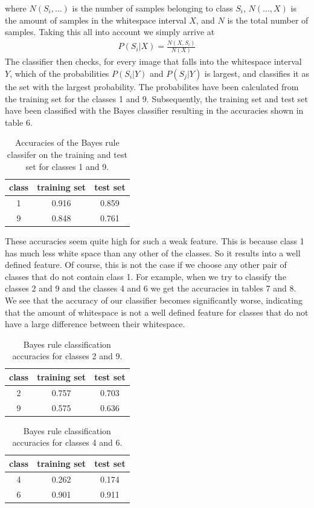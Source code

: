 \documentclass[11pt]{article}
\begin{document}
where $N(S_i, ...)$ is the number of samples belonging to class $S_i$, $N(..., X)$ is the amount of samples in the whitespace interval $X$, and $N$ is the total number of samples. Taking this all into account we simply arrive at
\begin{align}
P(S_i|X)=\frac{N(X, S_i)}{N(X)}
\end{align}
The classifier then checks, for every image that falls into the whitespace interval $Y$, which of the probabilities $P(S_i|Y)$ and $P(S_j|Y)$ is largest, and classifies it as the set with the largest probability. The probabilites have been calculated from the training set for the classes 1 and 9. Subsequently, the training set and test set have been classified with the Bayes classifier resulting in the accuracies shown in table 6.\par
\begin{table}[t]
\centering
\small
\begin{tabular}{c|cc}
class&training set&test set\\\hline
1&0.916&0.859\\
9&0.848&0.761\\
\end{tabular}
\caption{Accuracies of the Bayes rule classifer on the training and test set for classes 1 and 9.}
\normalsize
\end{table}
These accuracies seem quite high for such a weak feature. This is because class 1 has much less white space than any other of the classes. So it results into a well defined feature. Of course, this is not the case if we choose any other pair of classes that do not contain class 1. For example, when we try to classify the classes 2 and 9 and the classes 4 and 6 we get the accuracies in tables 7 and 8.
We see that the accuracy of our classifier becomes significantly worse, indicating that the amount of whitespace is not a well defined feature for classes that do not have a large difference between their whitespace.
\begin{table}[!h]
\centering
\small
\begin{tabular}{c|cc}
class&training set&test set\\\hline
2&0.757&0.703\\
9&0.575&0.636
\end{tabular}
\caption{Bayes rule classification accuracies for classes 2 and 9.}
\normalsize
\end{table}
\begin{table}[!h]
\centering
\small
\begin{tabular}{c|cc}
class&training set&test set\\\hline
4&0.262&0.174\\
6&0.901&0.911
\end{tabular}
\caption{Bayes rule classification accuracies for classes 4 and 6.}
\normalsize
\end{table}
\end{document}
